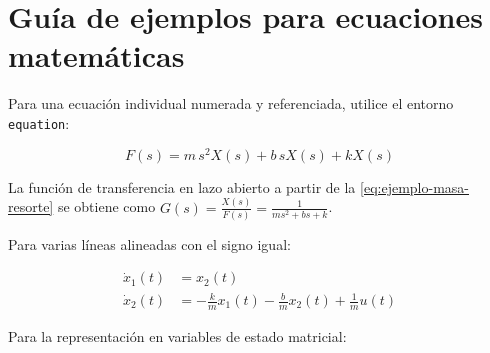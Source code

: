 
\section{Guía de ejemplos para ecuaciones matemáticas}
\label{sec:ejemplo-ecuaciones}

Para una ecuación individual numerada y referenciada, utilice el entorno \texttt{equation}:

\begin{equation}
    F(s) = m \, s^2 X(s) + b \, s X(s) + k X(s)
    \label{eq:ejemplo-masa-resorte}
\end{equation}

\noindent La función de transferencia en lazo abierto a partir de la \eqref{eq:ejemplo-masa-resorte} se obtiene como $G(s) = \frac{X(s)}{F(s)} = \frac{1}{m s^2 + b s + k}$.

Para varias líneas alineadas con el signo igual:

\begin{align}
    \dot{x}_1(t) &= x_2(t) \label{eq:espacio-estados-1} \\
    \dot{x}_2(t) &= -\frac{k}{m} x_1(t) - \frac{b}{m} x_2(t) + \frac{1}{m} u(t) \label{eq:espacio-estados-2}
\end{align}

Para la representación en variables de estado matricial:

